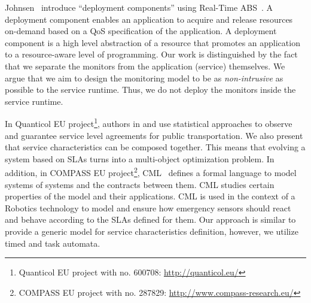 Johnsen~\cite{johnsen2012modeling} introduce ``deployment components'' using Real-Time ABS~\cite{bjork2013:rtabs}.
A deployment component enables an application to acquire and release resources on-demand based on a QoS specification of the application.
A deployment component is a high level abstraction of a resource that promotes an application to a resource-aware level of programming.
Our work is distinguished by the fact that we separate the monitors from the application (service) themselves.
We argue that we aim to design the monitoring model to be as \emph{non-intrusive} as possible to the service runtime. 
Thus, we do not deploy the monitors inside the service runtime.

In Quanticol EU project\footnote{Quanticol EU project with no. 600708: \url{http://quanticol.eu/}}, authors in \cite{coles2011cost} and \cite{gilmore2011non} use statistical approaches to observe and guarantee service level agreements for public transportation.
We also present that service characteristics can be composed together. 
This means that evolving a system based on SLAs turns into a multi-object optimization problem.
In addition, in COMPASS EU project\footnote{COMPASS EU project with no. 287829: \url{http://www.compass-research.eu/}}, CML~\cite{woodcock2014contracts} defines a formal language to model systems of systems and the contracts between them.
CML studies certain properties of the model and their applications.
CML is used in the context of a Robotics technology to model and ensure how emergency sensors should react and behave according to the SLAs defined for them.
Our approach is similar to provide a generic model for service characteristics definition, however, we utilize timed and task automata.

